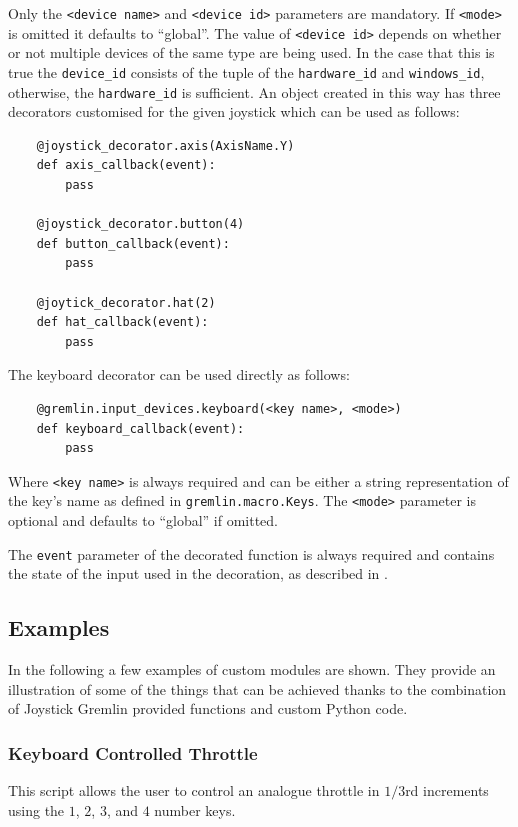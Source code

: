 \documentclass[a4, 10pt]{article}
\newcommand{\JG}{Joystick Gremlin}
\begin{document}
Only the \verb+<device name>+ and \verb+<device id>+ parameters are
mandatory. If \verb+<mode>+ is omitted it defaults to ``global''. The
value of \verb+<device id>+ depends on whether or not multiple devices
of the same type are being used. In the case that this is true the
\verb+device_id+ consists of the tuple of the \verb+hardware_id+ and
\verb+windows_id+, otherwise, the \verb+hardware_id+ is sufficient. An
object created in this way has three decorators customised for the given
joystick which can be used as follows:
\begin{verbatim}
    @joystick_decorator.axis(AxisName.Y)
    def axis_callback(event):
        pass

    @joystick_decorator.button(4)
    def button_callback(event):
        pass

    @joytick_decorator.hat(2)
    def hat_callback(event):
        pass
\end{verbatim}

The keyboard decorator can be used directly as follows:
\begin{verbatim}
    @gremlin.input_devices.keyboard(<key name>, <mode>)
    def keyboard_callback(event):
        pass
\end{verbatim}

Where \verb+<key name>+ is always required and can be either a string
representation of the key's name as defined in
\verb+gremlin.macro.Keys+. The \verb+<mode>+ parameter is optional and
defaults to ``global'' if omitted.

The \verb+event+ parameter of the decorated function is always required
and contains the state of the input used in the decoration, as described
in .


\subsection{Examples}
\label{sec:cm_examples}

In the following a few examples of custom modules are shown. They
provide an illustration of some of the things that can be achieved
thanks to the combination of \JG{} provided functions and custom Python
code.


\subsubsection{Keyboard Controlled Throttle}

This script allows the user to control an analogue throttle in $1/3$rd
increments using the $1$, $2$, $3$, and $4$ number keys.
\end{document}
